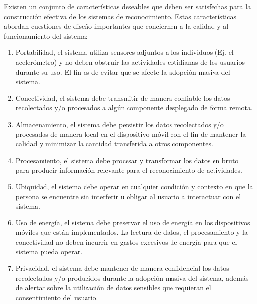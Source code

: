 Existen un conjunto de características deseables que deben ser satisfechas
para la construcción efectiva de los sistemas de reconocimiento. Estas
características abordan cuestiones de diseño importantes que conciernen
a la calidad y al funcionamiento del sistema:
\begin{enumerate}
\item Portabilidad, el sistema utiliza sensores adjuntos a los individuos
(Ej. el acelerómetro) y no deben obstruir las actividades cotidianas
de los usuarios durante su uso. El fin es de evitar que se afecte
la adopción masiva del sistema. 
\item Conectividad, el sistema debe transmitir de manera confiable los datos
recolectados y/o procesados a algún componente desplegado de forma
remota. 
\item Almacenamiento, el sistema debe persistir los datos recolectados y/o
procesados de manera local en el dispositivo móvil con el fin de mantener
la calidad y minimizar la cantidad transferida a otros componentes.
\item Procesamiento, el sistema debe procesar y transformar los datos en
bruto para producir información relevante para el reconocimiento de
actividades.
\item Ubiquidad, el sistema debe operar en cualquier condición y contexto
en que la persona se encuentre sin interferir u obligar al usuario
a interactuar con el sistema.
\item Uso de energía, el sistema debe preservar el uso de energía en los
dispositivos móviles que están implementados. La lectura de datos,
el procesamiento y la conectividad no deben incurrir en gastos excesivos
de energía para que el sistema pueda operar.
\item Privacidad, el sistema debe mantener de manera confidencial los datos
recolectados y/o producidos durante la adopción masiva del sistema,
además de alertar sobre la utilización de datos sensibles que requieran
el consentimiento del usuario.
\end{enumerate}

